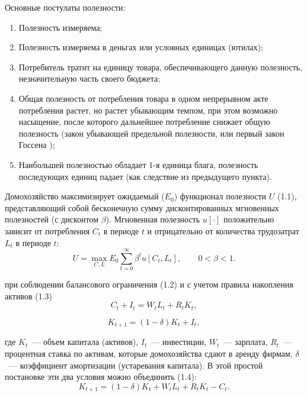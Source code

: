 Основные постулаты полезности:
\begin{enumerate}
    \item Полезность измеряема;
    
    \item Полезность измеряема в деньгах или условных единицах (ютилах);
    
    \item Потребитель тратит на единицу товара, обеспечивающего данную
    полезность, незначительную часть своего бюджета;
    
    \item Общая полезность от потребления товара в одном непрерывном акте
    потребления растет, но растет убывающим темпом, при этом возможно
    насыщение, после которого дальнейшее потребление снижает общую
    полезность (закон убывающей предельной полезности, или первый закон
    Госсена \cite{gossen1854entwickelung});
    
    \item Наибольшей полезностью обладает 1-я единица блага, полезность
    последующих единиц падает (как следствие из предыдущего пункта).
\end{enumerate}

  Домохозяйство максимизирует ожидаемый ($E_0$) функционал полезности $U$ (1.1),
  представляющий собой бесконечную сумму дисконтированных мгновенных полезностей
  (с дисконтом $\beta$). Мгновенная полезность $u[\cdot]$ положительно зависит
  от потребления $C_t$ в периоде $t$ и отрицательно от количества трудозатрат
  $L_t$ в периоде $t$:
  \begin{equation}
      U = \max_{C,L} E_0 \sum_{t=0}^{\infty} \beta^t u[C_t, L_t],
      \qquad 0 < \beta < 1.
  \end{equation}

  при соблюдении балансового ограничения (1.2) и с учетом правила накопления активов (1.3)
  \begin{equation}
      C_t + I_t = W_t L_t + R_t K_t,
  \end{equation}

  \begin{equation}
      K_{t+1} = (1 - \delta) K_t + I_t,
  \end{equation}

  где $K_t$~--- объем капитала (активов), $I_t$~--- инвестиции,
  $W_t$~--- зарплата, $R_t$~--- процентная ставка по активам, которые
  домохозяйства сдают в аренду фирмам, $\delta$~--- коэффициент амортизации
  (устаревания капитала). В этой простой постановке эти два условия можно
  объединить (1.4):
  \begin{equation}
      K_{t+1} = (1 - \delta)K_t + W_t L_t + R_t K_t - C_t.
  \end{equation}

